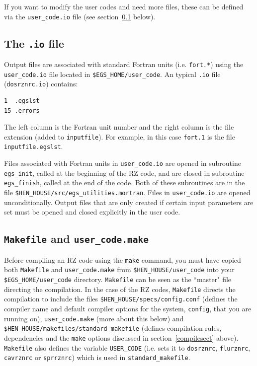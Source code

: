 \documentclass[12pt,twoside]{article}  %
\begin{document}
If you want to modify the user codes and need more files, these can be
defined via the {\tt user\_code.io} file (see section~\ref{iofilesect}
below).

\subsection{The {\tt .io} file}
\label{iofilesect}

Output files are associated with standard Fortran units (i.e. {\tt fort.*})
using the {\tt user\_code.io} file located in
{\tt \$EGS\_HOME/user\_code}.  An typical {\tt .io} file
({\tt dosrznrc.io}) contains:
\begin{verbatim}
1  .egslst
15 .errors
\end{verbatim}
The left column is the Fortran unit number and the right column is the
file extension (added to {\tt inputfile}).  For example, in this case
{\tt fort.1} is the file {\tt inputfile.egslst}.

Files associated with Fortran units in {\tt user\_code.io} are opened
in subroutine {\tt egs\_init}, called at the
beginning of the RZ code, and are closed in subroutine
{\tt egs\_finish}, called at the end of the code.  Both of these subroutines
are in the file {\tt \$HEN\_HOUSE/src/egs\_utilities.mortran}.  Files
in {\tt user\_code.io} are opened unconditionally.
Output files that are only created if certain input parameters are set must
be opened and closed explicitly in the user code.

\subsection{{\tt Makefile} and {\tt user\_code.make}}
\label{makefilesect}

Before compiling an RZ code using the {\tt make}
command, you must have copied both
{\tt Makefile} and {\tt user\_code.make} from
{\tt \$HEN\_HOUSE/user\_code} into your {\tt \$EGS\_HOME/user\_code}
directory.  {\tt Makefile} can be seen as the ``master" file directing
the compilation.  In the case of the RZ codes, {\tt Makefile} directs
the compilation to include the files {\tt \$HEN\_HOUSE/specs/config.conf}
(defines the compiler name and default compiler options for the system,
{\tt config}, that you are running on), {\tt user\_code.make} (more about
this below) and {\tt \$HEN\_HOUSE/makefiles/standard\_makefile}
(defines compilation rules, dependencies and the {\tt make} options
discussed in section~\ref{compilesect} above).  {\tt Makefile} also
defines the variable {\tt USER\_CODE} (i.e. sets it to {\tt dosrznrc},
{\tt flurznrc}, {\tt cavrznrc} or {\tt sprrznrc}) which is used
in {\tt standard\_makefile}.
\end{document}
